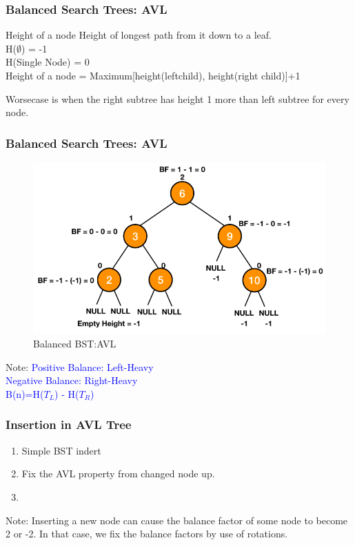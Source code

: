 \documentclass[11pt]{beamer}
\begin{document}
  \begin{frame}
    \frametitle{Balanced Search Trees: AVL}
	       \begin{block}{Height of a node}
	       	Height of longest path from it down to a leaf.\\
	       	H($\emptyset$) = -1\\
	       	H(Single Node) = 0\\
	       	Height of a node = Maximum[height(leftchild), height(right child)]+1\\
	       	\end{block}
       	  \alert{Worsecase is when the right subtree has height 1 more than left subtree for every node.}
   \end{frame}	

      \begin{frame}
    	\frametitle{Balanced Search Trees: AVL}
    	\begin{figure}
    		\centering
    		\includegraphics[width=0.8\linewidth]{"Screenshot 2020-11-21 at 12.21.29 AM"}
    		\caption{Balanced BST:AVL}
    		\label{fig:screenshot-2020-11-21-at-12}
    	\end{figure} 
      \alert{Note:}
       \textcolor{blue}{Positive Balance: Left-Heavy}\\	
        \textcolor{blue}{Negative Balance: Right-Heavy}\\	
         \textcolor{blue}{B(n)=H($T_{L}$)  - H($T_{R}$) }
    \end{frame}	
    
    \begin{frame}
    	\frametitle{Insertion in AVL Tree}
    	\begin{enumerate}
    		\item Simple BST indert
    		\item Fix the AVL property from changed node up.
    		\item 
    	\end{enumerate}
        \alert{	Note: Inserting a new node can cause the balance factor of some node to become 2 or -2. In that case, we fix the balance factors by use of rotations.}
    
    \end{frame}	
\end{document}
